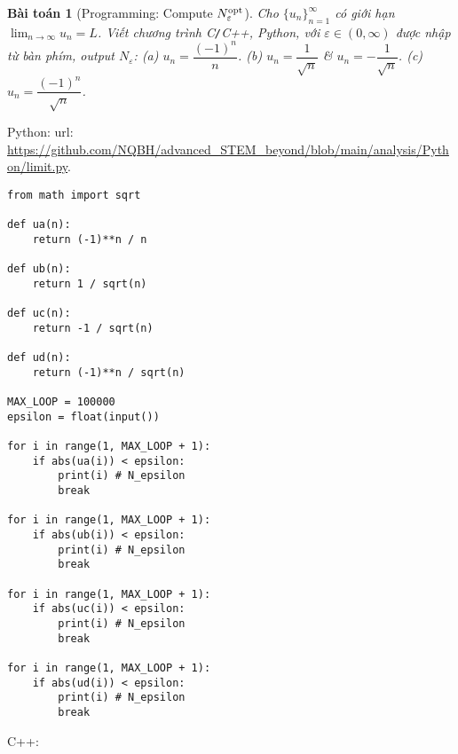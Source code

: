 \documentclass{article}
\newtheorem{baitoan}{Bài toán}
\begin{document}
\begin{baitoan}[Programming: Compute $N_\varepsilon^{\rm opt}$]
	Cho $\{u_n\}_{n=1}^\infty$ có giới hạn $\lim_{n\to\infty} u_n = L$. Viết chương trình {\sf C{\tt/}C++, Python}, với $\varepsilon\in(0,\infty)$ được nhập từ bàn phím, output $N_\varepsilon$: (a) $u_n = \dfrac{(-1)^n}{n}$. (b) $u_n = \dfrac{1}{\sqrt{n}}$ \& $u_n = -\dfrac{1}{\sqrt{n}}$. (c) $u_n = \dfrac{(-1)^n}{\sqrt{n}}$.
\end{baitoan}
Python: {\sc url}: \url{https://github.com/NQBH/advanced_STEM_beyond/blob/main/analysis/Python/limit.py}.
\begin{verbatim}
from math import sqrt

def ua(n):
    return (-1)**n / n

def ub(n):
    return 1 / sqrt(n)

def uc(n):
    return -1 / sqrt(n)

def ud(n):
    return (-1)**n / sqrt(n)

MAX_LOOP = 100000
epsilon = float(input())

for i in range(1, MAX_LOOP + 1):
    if abs(ua(i)) < epsilon:
        print(i) # N_epsilon
        break

for i in range(1, MAX_LOOP + 1):
    if abs(ub(i)) < epsilon:
        print(i) # N_epsilon
        break

for i in range(1, MAX_LOOP + 1):
    if abs(uc(i)) < epsilon:
        print(i) # N_epsilon
        break

for i in range(1, MAX_LOOP + 1):
    if abs(ud(i)) < epsilon:
        print(i) # N_epsilon
        break
\end{verbatim}
C++:
\end{document}
